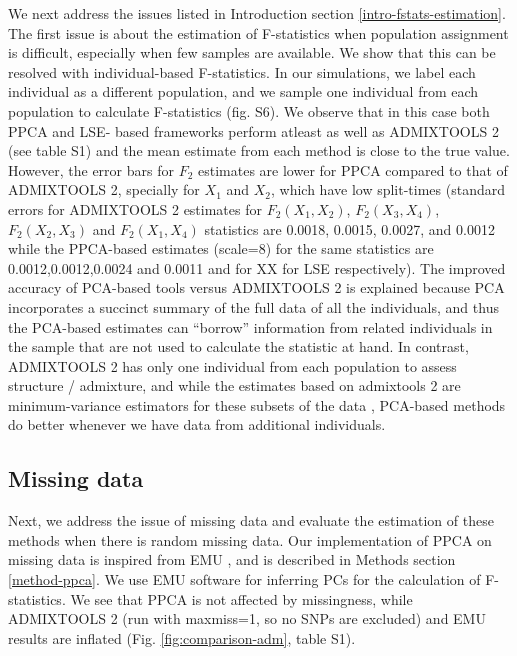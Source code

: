 \documentclass[12pt, letterpaper]{article}
\begin{document}
We next address the issues listed in Introduction section \ref{intro-fstats-estimation}. The first issue is about the estimation of F-statistics when population assignment is difficult, especially when few samples are available. We show that this can be resolved with individual-based F-statistics. In our simulations, we label each individual as a different population, and we sample one individual from each population to calculate F-statistics (fig. S6). We observe that in this case both PPCA and LSE- based frameworks perform atleast as well as ADMIXTOOLS 2 (see table S1) and the mean estimate from each method is close to the true value. However, the error bars for $F_2$ estimates are lower for PPCA compared to that of ADMIXTOOLS 2, specially for $X_1$ and $X_2$, which have low split-times (standard errors for ADMIXTOOLS 2 estimates for $F_2(X_1,X_2)$, $F_2(X_3,X_4)$, $F_2(X_2,X_3)$ and $F_2(X_1,X_4)$ statistics are 0.0018, 0.0015, 0.0027, and 0.0012 while the PPCA-based estimates (scale=8) for the same statistics are 0.0012,0.0012,0.0024 and 0.0011 and for XX for LSE respectively). The improved accuracy of PCA-based tools versus ADMIXTOOLS 2 is explained because PCA incorporates a succinct summary of the full data of all the individuals, and thus the PCA-based estimates can ``borrow'' information from related individuals in the sample that are not used to calculate the statistic at hand. In contrast, ADMIXTOOLS 2 has only one individual from each population to assess structure / admixture, and while the estimates based on admixtools 2 are minimum-variance estimators for these subsets of the data \citep{patterson_ancient_2012}, PCA-based methods do better whenever we have data from additional individuals.

\subsection{Missing data}
Next, we address the issue of missing data and evaluate the estimation of these methods when there is random missing data. Our implementation of PPCA on missing data is inspired from EMU \cite{meisner_large-scale_2021}, and is described in Methods section \ref{method-ppca}. We use EMU software for inferring PCs for the calculation of F-statistics. We see that PPCA is not affected by missingness, while ADMIXTOOLS 2 (run with maxmiss=1, so no SNPs are excluded) and EMU results are inflated (Fig. \ref{fig:comparison-adm}, table S1).
\end{document}

